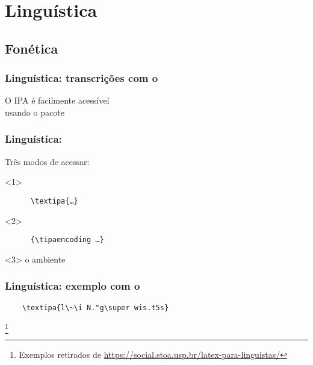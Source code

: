 \section{Linguística}

\subsection{Fonética}
\begin{frame}
  \frametitle{Linguística: transcrições com o }
  \huge
  O IPA é facilmente acessível\\ usando o pacote 
\end{frame}

\begin{frame}[fragile]
  \frametitle{Linguística: }
  \huge

  Três modos de acessar:
  \begin{onlyenv}<1>
    \begin{verbatim}
      \textipa{…}
    \end{verbatim}
  \end{onlyenv}

  \begin{onlyenv}<2>
    \begin{verbatim}
      {\tipaencoding …}
    \end{verbatim}
  \end{onlyenv}

  \begin{onlyenv}<3>
    o ambiente 
  \end{onlyenv}
\end{frame}

\begin{frame}[fragile]
  \frametitle{Linguística: exemplo com o }
  \huge

  \begin{verbatim}
    \textipa{l\~\i N."g\super wis.t5s}
  \end{verbatim}

  \footnote{Exemplos retirados de
  \url{https://social.stoa.usp.br/latex-para-linguistas/}}

\end{frame}


